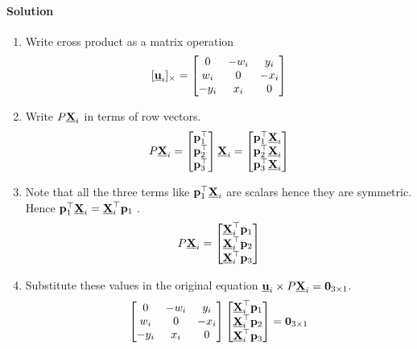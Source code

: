 \documentclass{article}
\begin{document}
\paragraph*{Solution}
\begin{enumerate}
\item Write cross product as a matrix operation
  \[ [\underline{\mathbf{u}}_i]_{\times}= \begin{bmatrix}
      0 & -w_i & y_i \\
      w_i & 0 & -x_i \\
      -y_i & x_i & 0
    \end{bmatrix}\]
  \item Write $P \underline{\mathbf{X}}_i$ in terms of row vectors.
    \[ P \underline{\mathbf{X}}_i = \begin{bmatrix}
        \mathbf{p}_1^\top
        \\
        \mathbf{p}_2^\top
        \\
        \mathbf{p}_3^\top
      \end{bmatrix}\underline{\mathbf{X}}_i =  \begin{bmatrix}
        \mathbf{p}_1^\top\underline{\mathbf{X}}_i
        \\
        \mathbf{p}_2^\top\underline{\mathbf{X}}_i
        \\
        \mathbf{p}_3^\top\underline{\mathbf{X}}_i
      \end{bmatrix}\]
    \item Note that all the three terms like $\mathbf{p}_1^\top \underline{\mathbf{X}}_i$ are scalars
      hence they are symmetric. Hence $\mathbf{p}_1^\top \underline{\mathbf{X}}_i = \underline{\mathbf{X}}_i^\top \mathbf{p}_1$ .
      \[ P \underline{\mathbf{X}}_i = \begin{bmatrix}
          \underline{\mathbf{X}}_i^\top\mathbf{p}_1
                 \\
          \underline{\mathbf{X}}_i^\top \mathbf{p}_2
                 \\
          \underline{\mathbf{X}}_i^\top\mathbf{p}_3
        \end{bmatrix}\]
    \item Substitute these values in the original equation $\underline{\mathbf{u}}_i \times
      P\underline{\mathbf{X}}_i = \mathbf{0}_{3\times 1}$.
      \[
        \begin{bmatrix}
          0 & -w_i & y_i \\
          w_i & 0 & -x_i \\
          -y_i & x_i & 0
        \end{bmatrix}
        \begin{bmatrix}
          \underline{\mathbf{X}}_i^\top\mathbf{p}_1
          \\
          \underline{\mathbf{X}}_i^\top \mathbf{p}_2
          \\
          \underline{\mathbf{X}}_i^\top\mathbf{p}_3
        \end{bmatrix} = \mathbf{0}_{3 \times 1}
\]
\end{enumerate}
\end{document}
